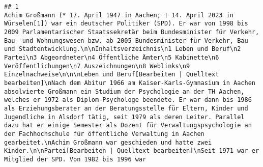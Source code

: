 \documentclass[
]{article}
\begin{document}
\begin{verbatim}
## 1                                                                                                                                                                                                                                                                                                                                                                                                                                                                                                                                                                                                                                                                                                                                                                                                                                                                                                                                                                                                                                                                                                                                                                                                                                                                                                                                                                                                                                                                                                                                                                                                                                                                                                                                                                                                                                                                                                                                                                                                                                                                                                                                                                                                                                                          Achim Großmann (* 17. April 1947 in Aachen; † 14. April 2023 in Würselen[1]) war ein deutscher Politiker (SPD). Er war von 1998 bis 2009 Parlamentarischer Staatssekretär beim Bundesminister für Verkehr, Bau- und Wohnungswesen bzw. ab 2005 Bundesminister für Verkehr, Bau und Stadtentwicklung.\n\nInhaltsverzeichnis\n1 Leben und Beruf\n2 Partei\n3 Abgeordneter\n4 Öffentliche Ämter\n5 Kabinette\n6 Veröffentlichungen\n7 Auszeichnungen\n8 Weblinks\n9 Einzelnachweise\n\n\nLeben und Beruf[Bearbeiten | Quelltext bearbeiten]\nNach dem Abitur 1966 am Kaiser-Karls-Gymnasium in Aachen absolvierte Großmann ein Studium der Psychologie an der TH Aachen, welches er 1972 als Diplom-Psychologe beendete. Er war dann bis 1986 als Erziehungsberater an der Beratungsstelle für Eltern, Kinder und Jugendliche in Alsdorf tätig, seit 1979 als deren Leiter. Parallel dazu hat er einige Semester als Dozent für Verwaltungspsychologie an der Fachhochschule für öffentliche Verwaltung in Aachen gearbeitet.\nAchim Großmann war geschieden und hatte zwei Kinder.\n\nPartei[Bearbeiten | Quelltext bearbeiten]\nSeit 1971 war er Mitglied der SPD. Von 1982 bis 1996 war 
\end{verbatim}
\end{document}
